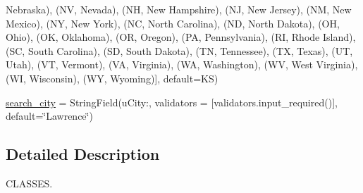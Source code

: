 \begin{DoxyCompactItemize}
\textquotesingle{}Nebraska\textquotesingle{}), (\textquotesingle{}NV\textquotesingle{}, \textquotesingle{}Nevada\textquotesingle{}), (\textquotesingle{}NH\textquotesingle{}, \textquotesingle{}New Hampshire\textquotesingle{}), (\textquotesingle{}NJ\textquotesingle{}, \textquotesingle{}New Jersey\textquotesingle{}), (\textquotesingle{}NM\textquotesingle{}, \textquotesingle{}New Mexico\textquotesingle{}), (\textquotesingle{}NY\textquotesingle{}, \textquotesingle{}New York\textquotesingle{}), (\textquotesingle{}NC\textquotesingle{}, \textquotesingle{}North Carolina\textquotesingle{}), (\textquotesingle{}ND\textquotesingle{}, \textquotesingle{}North Dakota\textquotesingle{}), (\textquotesingle{}OH\textquotesingle{}, \textquotesingle{}Ohio\textquotesingle{}), (\textquotesingle{}OK\textquotesingle{}, \textquotesingle{}Oklahoma\textquotesingle{}), (\textquotesingle{}OR\textquotesingle{}, \textquotesingle{}Oregon\textquotesingle{}), (\textquotesingle{}PA\textquotesingle{}, \textquotesingle{}Pennsylvania\textquotesingle{}), (\textquotesingle{}RI\textquotesingle{}, \textquotesingle{}Rhode Island\textquotesingle{}), (\textquotesingle{}SC\textquotesingle{}, \textquotesingle{}South Carolina\textquotesingle{}), (\textquotesingle{}SD\textquotesingle{}, \textquotesingle{}South Dakota\textquotesingle{}), (\textquotesingle{}TN\textquotesingle{}, \textquotesingle{}Tennessee\textquotesingle{}), (\textquotesingle{}TX\textquotesingle{}, \textquotesingle{}Texas\textquotesingle{}), (\textquotesingle{}UT\textquotesingle{}, \textquotesingle{}Utah\textquotesingle{}), (\textquotesingle{}VT\textquotesingle{}, \textquotesingle{}Vermont\textquotesingle{}), (\textquotesingle{}VA\textquotesingle{}, \textquotesingle{}Virginia\textquotesingle{}), (\textquotesingle{}WA\textquotesingle{}, \textquotesingle{}Washington\textquotesingle{}), (\textquotesingle{}WV\textquotesingle{}, \textquotesingle{}West Virginia\textquotesingle{}), (\textquotesingle{}WI\textquotesingle{}, \textquotesingle{}Wisconsin\textquotesingle{}), (\textquotesingle{}WY\textquotesingle{}, \textquotesingle{}Wyoming\textquotesingle{})\mbox{]}, default=\textquotesingle{}KS\textquotesingle{})
\item 
\mbox{\hyperlink{classserver_1_1server_1_1_input_form_a219d510984378b86ca3c87003cba3ab2}{search\+\_\+city}} = String\+Field(u\textquotesingle{}City\+:\textquotesingle{}, validators = \mbox{[}validators.\+input\+\_\+required()\mbox{]}, default=\char`\"{}Lawrence\char`\"{})
\end{DoxyCompactItemize}


\subsection{Detailed Description}
C\+L\+A\+S\+S\+ES. 

